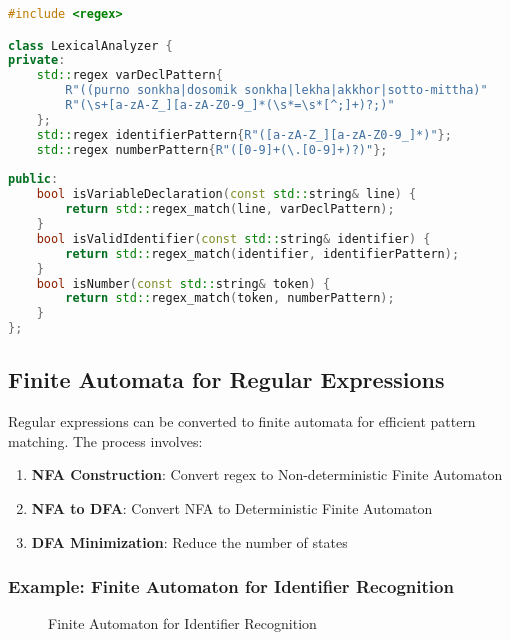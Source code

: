 \documentclass[12pt,a4paper]{article}
\begin{document}
\begin{lstlisting}[language=C++, caption=Regular Expression Implementation for Variable Declaration]
#include <regex>

class LexicalAnalyzer {
private:
    std::regex varDeclPattern{
        R"((purno sonkha|dosomik sonkha|lekha|akkhor|sotto-mittha)"
        R"(\s+[a-zA-Z_][a-zA-Z0-9_]*(\s*=\s*[^;]+)?;)"
    };
    std::regex identifierPattern{R"([a-zA-Z_][a-zA-Z0-9_]*)"};
    std::regex numberPattern{R"([0-9]+(\.[0-9]+)?)"};
    
public:
    bool isVariableDeclaration(const std::string& line) {
        return std::regex_match(line, varDeclPattern);
    }
    bool isValidIdentifier(const std::string& identifier) {
        return std::regex_match(identifier, identifierPattern);
    }
    bool isNumber(const std::string& token) {
        return std::regex_match(token, numberPattern);
    }
};
\end{lstlisting}

\subsection{Finite Automata for Regular Expressions}

Regular expressions can be converted to finite automata for efficient pattern matching. The process involves:

\begin{enumerate}
    \item \textbf{NFA Construction}: Convert regex to Non-deterministic Finite Automaton
    \item \textbf{NFA to DFA}: Convert NFA to Deterministic Finite Automaton
    \item \textbf{DFA Minimization}: Reduce the number of states
\end{enumerate}

\subsubsection{Example: Finite Automaton for Identifier Recognition}

\begin{figure}[H]
    \centering
    \caption{Finite Automaton for Identifier Recognition}
\end{figure}
\end{document}

